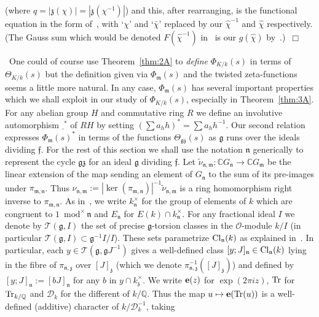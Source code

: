 \documentclass[12pt]{article}
\newcounter{rem}[section]%
\newcommand{\bbC}{\ensuremath{\mathbb{C}}}
\newcommand{\bbQ}{\ensuremath{\mathbb{Q}}}
\newcommand{\be}{\ensuremath{{\bf e}}}
\newcommand{\cD}{\ensuremath{\mathcal{D}}}
\newcommand{\Cl}{{\rm Cl}}
\newcommand{\cO}{\ensuremath{\mathcal{O}}}
\newcommand{\cT}{\ensuremath{\mathcal{T}}}
\newcommand{\ePf}{\hspace*{\fill}~$\Box$\vertsp\par}%
\newcommand{\ff}{\ensuremath{\mathfrak{f}}}
\newcommand{\fg}{\ensuremath{\mathfrak{g}}}
\newcommand{\fm}{\ensuremath{\mathfrak{m}}}
\newcommand{\fn}{\ensuremath{\mathfrak{n}}}
\newcommand{\fz}{\ensuremath{\mathfrak{z}}}
\newcommand{\inv}{^{-1}}%
\newcommand{\rem}{\refstepcounter{rem}\noindent{\sc Remark \therem}}%
\renewcommand{\therem}{\thesection.\arabic{rem}}
\newcommand{\Tr}{{\rm Tr}}
\newcommand{\vertsp}{\vspace{1ex}}
\newcommand{\PhiKk}{\ensuremath{\Phi_{K/k}}}
\newcommand{\ThetaKk}{\ensuremath{\Theta_{K/k}}}
\begin{document}
(where $q=|\fz(\chi)|=|\fz(\chi\inv)|$) and this, after rearranging,
is the functional equation in the form
of~\cite[Eq. (5)]{Tatu}, with `$\chi$' and `$\bar{\chi}$' replaced by our
$\hat{\chi}\inv$ and $\hat{\chi}$ respectively. (The Gauss sum which would
be denoted $F(\hat{\chi}\inv)$ in~\cite{Tatu}
is our $g(\hat{\chi})$ by~\cite[Rem. 6.3]{twizas}.)\ePf
\rem\ One could of course use Theorem~\ref{thm:2A} to \emph{define} $\PhiKk(s)$
in terms of $\ThetaKk(s)$ but the definition given via
$\Phi_\fm(s)$ and the twisted zeta-functions seems a little more natural. In any case,
$\Phi_\fm(s)$ has several important properties which we shall exploit in our
study of $\PhiKk(s)$, especially in Theorem~\ref{thm:3A}.\vspace{1ex}\\
For any abelian group $H$ and commutative ring $R$
we define an involutive automorphism $\underline{\ }^\ast$ of $RH$ by setting
$(\sum a_hh)^\ast=\sum a_hh\inv$.
Our second relation expresses $\Phi_{\fm}(s)^\ast$ in terms of the functions
$\Theta_{\fg\fz}(s)$ as
$\fg$ runs over the ideals dividing $\ff$.
For the rest of this section
we shall use the notation $\fn$ generically to represent the cycle $\fg\fz$
for an ideal $\fg$ dividing $\ff$.
Let $\tilde{\nu}_{\fn,\fm}:\bbC G_{\fn}\rightarrow \bbC G_\fm$ be
the linear extension of the map sending an element of $G_{\fn}$ to the sum of its
pre-images under $\pi_{\fm,\fn}$. Thus $\nu_{\fn,\fm}:=|\ker(\pi_{\fm,\fn})|\inv
\tilde{\nu}_{\fn,\fm}$ is a ring homomorphism right inverse to $\pi_{\fm,\fn}$.
As in~\cite{twizas}, we write
$k^\times_{\fn}$ for the group of elements
of $k$ which are congruent to $1$~$\mbox{mod}^\times\,\fn$ and $E_{\fn}$ for
$E(k)\cap k_{\fn}^\times$. For any fractional ideal $I$ we denote by
$\cT(\fg,I)$ the set of precise $\fg$-torsion classes in the $\cO$-module
$k/I$ (in particular $\cT(\fg,I)\subset {\fg}\inv I/I$).
These sets parametrize $\Cl_{\fn}(k)$ as explained
in~\cite[Prop./Def. 6.1]{twizas}. In particular, each $y\in\cT(\fg,\fg J\inv)$
gives a well-defined class $[y;J]_{\fn}\in\Cl_{\fn}(k)$
lying in the fibre  of $\pi_{\fn,\fz}$ over
$[J]_\fz$ (which we  denote
$\pi_{\fn,\fz}\inv([J]_\fz)$)
and defined by $[y;J]_{\fn}:=[bJ]_{\fn}$ for any $b$ in $y\cap k^{\times}_\fz$.
We write $\be(z)$ for $\exp(2\pi i z)$, $\Tr$ for $\Tr_{k/\bbQ}$ and
$\cD_k$ for the different of $k/\bbQ$. Thus the map
$u\mapsto \be(\Tr(u))$ is a well-defined (additive) character of $k/\cD_k\inv$, taking
\end{document}
